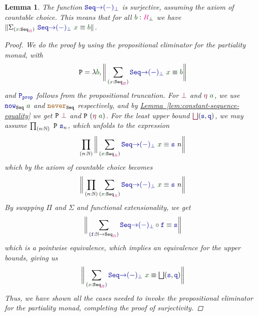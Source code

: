 \documentclass[twoside,11pt,openright]{report}
\theoremstyle{plain} %
\newtheorem{lem}[thm]{Lemma}
\theoremstyle{definition}
\theoremstyle{remark}
\newcommand*{\lemref}[1]{\hyperref[lem:#1]{Lemma~\ref*{lem:#1}}}
\newcommand*{\term}[1]{\textcolor{green!30!black}{#1}} %
\newcommand*{\type}[1]{\textcolor{magenta!90!black}{#1}}
\newcommand*{\constant}[1]{\textcolor{orange!60!black}{\ensuremath{\mathtt{#1}}}}
\newcommand*{\function}[1]{\textcolor{blue!60!black}{\ensuremath{\mathtt{#1}}}}
\newcommand*{\constructor}[1]{\textcolor{purple!60!black}{\ensuremath{\mathtt{#1}}}}
\newcommand*{\typeformer}[1]{\ensuremath{\mathtt{#1}}}
\begin{document}
\begin{lem}
  The function \(\function{Seq{\rightarrow}(-)_{\bot}}\) is surjective, assuming the axiom of countable choice. This means that for all \(\term{b} : \type{R}_{\bot}\) we have \(\| \Sigma_{(\term{x} : \typeformer{Seq}_{\type{R}})}~\function{Seq{\rightarrow}(-)_{\bot}}~\term{x} \equiv \term{b} \|\).
  \begin{proof}
    We do the proof by using the propositional eliminator for the partiality monad, with
    \begin{equation}
      \typeformer{P} = \lambda \term{b}, \bigg\| \sum_{(\term{x} : \typeformer{Seq}_{\type{R}})} \function{Seq{\rightarrow}(-)_{\bot}}~\term{x} \equiv \term{b} \bigg\|
    \end{equation}
    and \(\function{P_{prop}}\) follows from the propositional truncation. For \(\constructor{\bot}\) and \(\constructor{\eta}~\term{a}\), we use \(\function{now}_{\typeformer{Seq}}~\term{a}\) and \(\constant{never}_{\typeformer{Seq}}\) respectively, and by \lemref{constant-sequence-equality} we get \(\typeformer{P}~\constructor{\bot}\) and \(\typeformer{P}~(\constructor{\eta}~\term{a})\). For the least upper bound \(\constructor{\bigsqcup} (\function{s},\function{q})\), we may assume \(\prod_{(n : \mathbb{N})}~\typeformer{P}~\function{s}_n\), which unfolds to the expression
    \begin{equation}
    \prod_{(n : \mathbb{N})} \bigg\| \sum_{(\term{x} : \typeformer{Seq}_{\type{R}})} \function{Seq{\rightarrow}(-)_{\bot}}~\term{x} \equiv \function{s}~n \bigg\|
  \end{equation}
  which by the axiom of countable choice becomes
  \begin{equation}
    \bigg\| \prod_{(n : \mathbb{N})} \sum_{(\term{x} : \typeformer{Seq}_{\type{R}})} \function{Seq{\rightarrow}(-)_{\bot}}~\term{x} \equiv \function{s}~n \bigg\|
  \end{equation}
  By swapping \(\Pi\) and \(\Sigma\) and functional extensionality, we get
    \begin{equation}
    \bigg\| \sum_{(\function{f} : \mathbb{N} \rightarrow \typeformer{Seq}_{\type{R}})} \function{Seq{\rightarrow}(-)_{\bot}} \circ \function{f} \equiv \function{s} \bigg\|
  \end{equation}
  which is a pointwise equivalence, which implies an equivalence for the upper bounds, giving us
  \begin{equation}
    \bigg\| \sum_{(\term{x} : \typeformer{Seq}_{\type{R}})} \function{Seq{\rightarrow}(-)_{\bot}}~\term{x} \equiv {\textstyle{\bigsqcup}}(\function{s},\function{q}) \bigg\|
  \end{equation}
  Thus, we have shown all the cases needed to invoke the propositional eliminator for the partiality monad, completing the proof of surjectivity.
  \end{proof}
\end{lem}
\end{document}
